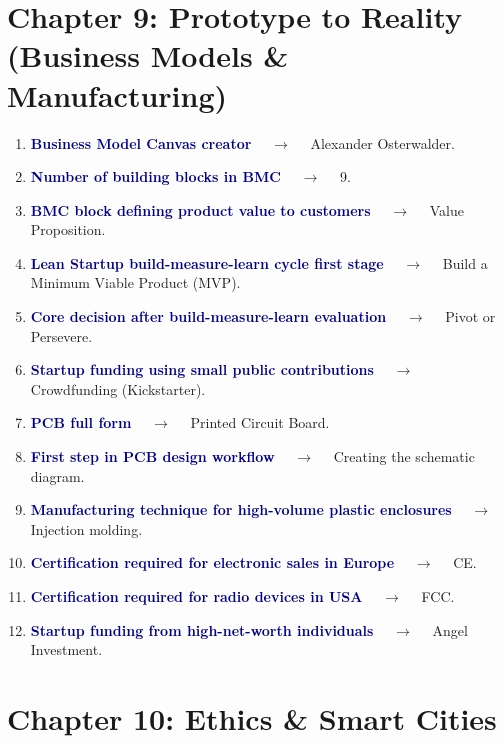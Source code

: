 \documentclass[11pt,a4paper]{article}
\begin{document}
\section*{Chapter 9: Prototype to Reality (Business Models \& Manufacturing)}

\begin{enumerate}[label=\arabic*., leftmargin=*, labelsep=0.8em, itemsep=0.35em, parsep=0.1em, topsep=0.2em]
  \item \textcolor{darkblue}{\textbf{Business Model Canvas creator}} $\quad\to\quad$ Alexander Osterwalder.
  \item \textcolor{darkblue}{\textbf{Number of building blocks in BMC}} $\quad\to\quad$ 9.
  \item \textcolor{darkblue}{\textbf{BMC block defining product value to customers}} $\quad\to\quad$ Value Proposition.
  \item \textcolor{darkblue}{\textbf{Lean Startup build-measure-learn cycle first stage}} $\quad\to\quad$ Build a Minimum Viable Product (MVP).
  \item \textcolor{darkblue}{\textbf{Core decision after build-measure-learn evaluation}} $\quad\to\quad$ Pivot or Persevere.
  \item \textcolor{darkblue}{\textbf{Startup funding using small public contributions}} $\quad\to\quad$ Crowdfunding (Kickstarter).
  \item \textcolor{darkblue}{\textbf{PCB full form}} $\quad\to\quad$ Printed Circuit Board.
  \item \textcolor{darkblue}{\textbf{First step in PCB design workflow}} $\quad\to\quad$ Creating the schematic diagram.
  \item \textcolor{darkblue}{\textbf{Manufacturing technique for high-volume plastic enclosures}} $\quad\to\quad$ Injection molding.
  \item \textcolor{darkblue}{\textbf{Certification required for electronic sales in Europe}} $\quad\to\quad$ CE.
  \item \textcolor{darkblue}{\textbf{Certification required for radio devices in USA}} $\quad\to\quad$ FCC.
  \item \textcolor{darkblue}{\textbf{Startup funding from high-net-worth individuals}} $\quad\to\quad$ Angel Investment.
\end{enumerate}

\section*{Chapter 10: Ethics \& Smart Cities}
\end{document}
